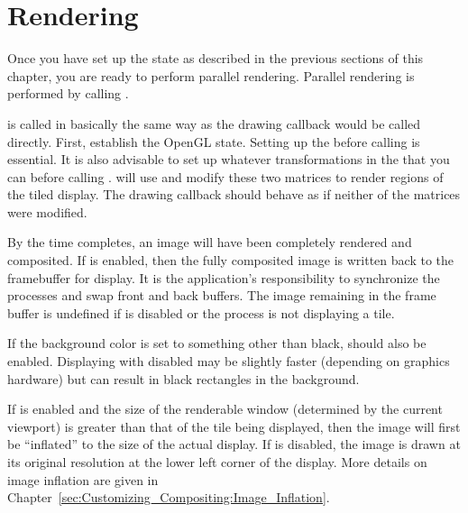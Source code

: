 

\section{Rendering}
\label{sec:Basic_Usage:Rendering}

Once you have set up the \IceT state as described in the previous sections
of this chapter, you are ready to perform parallel rendering.  Parallel
rendering is performed by calling .

\begin{Table}{3}
\end{Table}

 is called in basically the same way as the
drawing callback would be called directly.  First,
establish the OpenGL state.  Setting up the 
before calling  is essential.  It is also advisable to
set up whatever transformations in the  that
you can before calling .  \IceT will use and modify
these two matrices to render regions of the tiled display.  The drawing
callback should behave as if neither of the matrices were modified.

By the time  completes, an image will have been
completely rendered and composited.  If  is enabled,
then the fully composited image is written back to the \OpenGL framebuffer
for display.  It is the application's responsibility to synchronize the
processes and swap front and back buffers.  The image remaining in the
frame buffer is undefined if  is disabled or the
process is not displaying a tile.

If the \OpenGL background color is set to something other than black,
 should also be enabled.
Displaying with  disabled may be
slightly faster (depending on graphics hardware) but can result in black
rectangles in the background.

If  is enabled and the size of the renderable
window (determined by the current \OpenGL viewport) is greater than that of
the tile being displayed, then the image will first be ``inflated'' to the
size of the actual display.  If  is disabled,
the image is drawn at its original resolution at the lower left corner of
the display.  More details on image inflation are given in
Chapter~\ref{sec:Customizing_Compositing:Image_Inflation}.

